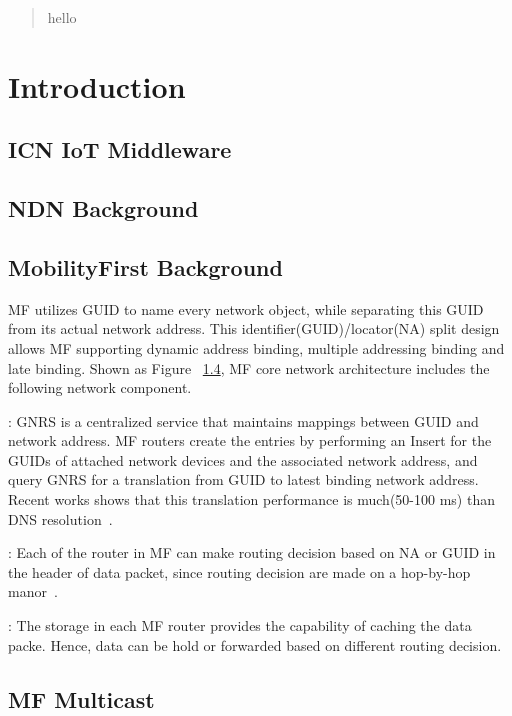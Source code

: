 \begin{abstract}
hello
\end{abstract}

\section{Introduction}
\subsection{ICN IoT Middleware}
\subsection{NDN Background}
\subsection{MobilityFirst Background}
MF utilizes GUID to name every network object, while separating this GUID from its actual network address. This identifier(GUID)/locator(NA) split design allows MF supporting dynamic address binding, multiple addressing binding and late binding. Shown as Figure ~\ref{}, MF core network architecture includes the following network component.

\vspace{1mm}: GNRS is a centralized service that maintains mappings between GUID and network address. MF routers create the entries by performing an Insert for the GUIDs of attached network devices and the associated network address, and query GNRS for a translation from GUID to latest binding network address. Recent works shows that this translation performance is much(50-100 ms) than DNS resolution~\cite{vu2012dmap}.

\vspace{1mm}: Each of the router in MF can make routing decision based on NA or GUID in the header of data packet, since routing decision are made on a hop-by-hop manor~\cite{nelson2011gstar}.

\vspace{1mm}: The storage in each MF router provides the capability of caching the data packe. Hence, data can be hold or forwarded based on different routing decision. 
\subsection{MF Multicast}